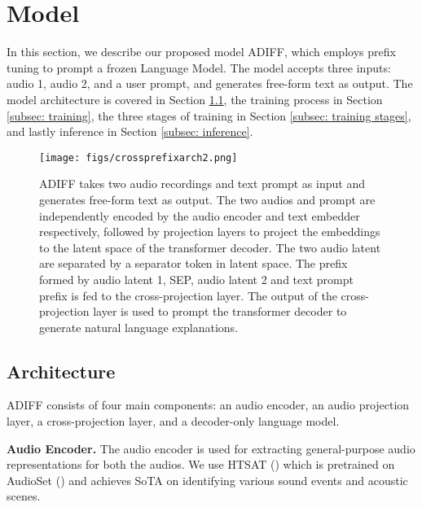  \vspace{-0.2in}
\section{Model} \vspace{-0.1in} \label{sec: adiff}
In this section, we describe our proposed model ADIFF, which employs prefix tuning to prompt a frozen Language Model. The model accepts three inputs: audio 1, audio 2, and a user prompt, and generates free-form text as output. The model architecture is covered in Section \ref{subsec: architecture}, the training process in Section \ref{subsec: training}, the three stages of training in Section \ref{subsec: training stages}, and lastly inference in Section \ref{subsec: inference}. 

\begin{figure}[!ht]
   \centering
     \texttt{[image: figs/crossprefixarch2.png]}
     \caption{\small ADIFF takes two audio recordings and text prompt as input and generates free-form text as output. The two audios and prompt are independently encoded by the audio encoder and text embedder respectively, followed by projection layers to project the embeddings to the latent space of the transformer decoder. The two audio latent are separated by a separator token in latent space. The prefix formed by audio latent 1, SEP, audio latent 2 and text prompt prefix is fed to the cross-projection layer. The output of the cross-projection layer is used to prompt the transformer decoder to generate natural language explanations.
     \vspace{-0.1in}
     }
     \label{fig:pengi_arch}
\end{figure}

\vspace{-0.1in}
\subsection{Architecture} \label{subsec: architecture} \vspace{-0.1in}
ADIFF consists of four main components: an audio encoder, an audio projection layer, a cross-projection layer, and a decoder-only language model.

\noindent \textbf{Audio Encoder.} The audio encoder is used for extracting general-purpose audio representations for both the audios. We use HTSAT (\cite{chen2022hts}) which is pretrained on AudioSet (\cite{audioset}) and achieves SoTA on identifying various sound events and acoustic scenes.

